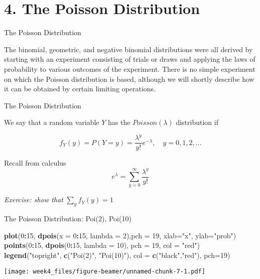 \documentclass[12pt,ignorenonframetext,compress]{beamer}
\newenvironment{Shaded}{\begin{snugshade}}{\end{snugshade}}
\newcommand{\KeywordTok}[1]{\textcolor[rgb]{0.13,0.29,0.53}{\textbf{#1}}}
\newcommand{\DataTypeTok}[1]{\textcolor[rgb]{0.13,0.29,0.53}{#1}}
\newcommand{\DecValTok}[1]{\textcolor[rgb]{0.00,0.00,0.81}{#1}}
\newcommand{\StringTok}[1]{\textcolor[rgb]{0.31,0.60,0.02}{#1}}
\newcommand{\OperatorTok}[1]{\textcolor[rgb]{0.81,0.36,0.00}{\textbf{#1}}}
\newcommand{\NormalTok}[1]{#1}
\let\oldShaded\Shaded
\let\endoldShaded\endShaded
\renewenvironment{Shaded}{\scriptsize\oldShaded}{\endoldShaded}
\begin{document}
\section{4. The Poisson Distribution}\label{the-poisson-distribution}

\begin{frame}{The Poisson Distribution}

The binomial, geometric, and negative binomial distributions were all
derived by starting with an experiment consisting of trials or draws and
applying the laws of probability to various outcomes of the experiment.
There is no simple experiment on which the Poisson distribution is
based, although we will shortly describe how it can be obtained by
certain limiting operations.

\end{frame}

\begin{frame}{The Poisson Distribution}

We say that a random variable \(Y\) has the \(Poisson(\lambda)\)
distribution if

\[ f_Y(y) = P(Y=y) = \frac{\lambda^y}{y!}e^{-\lambda}, \quad y = 0, 1, 2, \ldots\]

\pause

Recall from calculus
\[ e^\lambda = \sum_{y=0}^{\infty} \frac{\lambda^y}{y!}\]

\pause  \emph{Exercise: show that} \(\sum_y f_Y(y) =1\)

\end{frame}

\begin{frame}[fragile]{The Poisson Distribution: Poi(2), Poi(10)}

\begin{Shaded}
\begin{Highlighting}[]
\KeywordTok{plot}\NormalTok{(}\DecValTok{0}\OperatorTok{:}\DecValTok{15}\NormalTok{, }\KeywordTok{dpois}\NormalTok{(}\DataTypeTok{x =} \DecValTok{0}\OperatorTok{:}\DecValTok{15}\NormalTok{, }\DataTypeTok{lambda =} \DecValTok{2}\NormalTok{),}\DataTypeTok{pch =} \DecValTok{19}\NormalTok{, }\DataTypeTok{xlab=}\StringTok{"x"}\NormalTok{, }\DataTypeTok{ylab=}\StringTok{"prob"}\NormalTok{)}
\KeywordTok{points}\NormalTok{(}\DecValTok{0}\OperatorTok{:}\DecValTok{15}\NormalTok{, }\KeywordTok{dpois}\NormalTok{(}\DecValTok{0}\OperatorTok{:}\DecValTok{15}\NormalTok{, }\DataTypeTok{lambda =} \DecValTok{10}\NormalTok{), }\DataTypeTok{pch =} \DecValTok{19}\NormalTok{, }\DataTypeTok{col =} \StringTok{"red"}\NormalTok{)}
\KeywordTok{legend}\NormalTok{(}\StringTok{"topright"}\NormalTok{, }\KeywordTok{c}\NormalTok{(}\StringTok{"Poi(2)"}\NormalTok{, }\StringTok{"Poi(10)"}\NormalTok{), }\DataTypeTok{col =} \KeywordTok{c}\NormalTok{(}\StringTok{"black"}\NormalTok{,}\StringTok{"red"}\NormalTok{), }\DataTypeTok{pch=}\DecValTok{19}\NormalTok{)}
\end{Highlighting}
\end{Shaded}

\texttt{[image: week4\_files/figure-beamer/unnamed-chunk-7-1.pdf]}

\end{frame}
\end{document}
